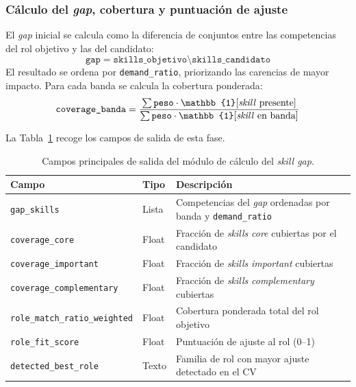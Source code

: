 \subsubsection{Cálculo del \textit{gap}, cobertura y puntuación de ajuste}
\label{subsubsec:calculo_gap_detalle}
El \textit{gap} inicial se calcula como la diferencia de conjuntos entre las competencias del rol objetivo y las del candidato:
\[
  \texttt{gap} = \texttt{skills\_objetivo} \setminus \texttt{skills\_candidato}
\]
El resultado se ordena por \texttt{demand\_ratio}, priorizando las carencias de mayor impacto. Para cada banda se calcula la cobertura ponderada:
\[
  \texttt{coverage\_banda} = \frac{\sum \texttt{peso} \cdot \mathbb{1}[\text{\textit{skill} presente}]}{\sum \texttt{peso} \cdot \mathbb{1}[\text{\textit{skill} en banda}]}
\]

La Tabla~\ref{tab:tabla3_8} recoge los campos de salida de esta fase.

\begin{table}[H]
  \caption{Campos principales de salida del módulo de cálculo del \textit{skill gap}.}
  \label{tab:tabla3_8}
  \centering
  \footnotesize
  \begin{tabular}{|p{4.5cm}|p{2.0cm}|p{7.0cm}|}
    \hline
    \rowcolor{gray!15}
    \textbf{Campo} & \textbf{Tipo} & \textbf{Descripción} \\
    \hline
    \texttt{gap\_skills}                  & Lista   & Competencias del \textit{gap} ordenadas por banda y \texttt{demand\_ratio} \\
    \hline
    \texttt{coverage\_core}               & Float   & Fracción de \textit{skills} \textit{core} cubiertas por el candidato \\
    \hline
    \texttt{coverage\_important}          & Float   & Fracción de \textit{skills} \textit{important} cubiertas \\
    \hline
    \texttt{coverage\_complementary}      & Float   & Fracción de \textit{skills} \textit{complementary} cubiertas \\
    \hline
    \texttt{role\_match\_ratio\_weighted} & Float   & Cobertura ponderada total del rol objetivo \\
    \hline
    \texttt{role\_fit\_score}             & Float   & Puntuación de ajuste al rol (0--1) \\
    \hline
    \texttt{detected\_best\_role}         & Texto   & Familia de rol con mayor ajuste detectado en el CV \\
    \hline
  \end{tabular}
\end{table}


